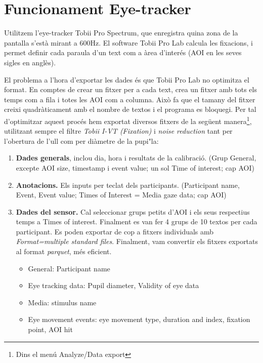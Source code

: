 \section{Funcionament Eye-tracker}\label{sec:tobii}

Utilitzem l'eye-tracker Tobii Pro Spectrum, que enregistra quina zona de la pantalla s'està mirant a 600Hz.
El software Tobii Pro Lab calcula les fixacions, i permet definir cada paraula d'un text com a àrea d'interés (AOI en les seves sigles en anglès).

El problema a l'hora d'exportar les dades és que Tobii Pro Lab no optimitza el format.
En comptes de crear un fitxer per a cada text, crea un fitxer amb tots els temps com a fila i totes les AOI com a columna.
Això fa que el tamany del fitxer creixi quadràticament amb el nombre de textos i el programa es bloquegi.
Per tal d'optimitzar aquest procés hem exportat diversos fitxers de la següent manera\footnote{Dins el menú Analyze/Data export},
utilitzant sempre el filtre \textit{Tobii I-VT (Fixation)} i \textit{noise reduction} tant per l'obertura de l'ull com per diàmetre de la pupi"la:

\begin{enumerate}
    \item \textbf{Dades generals}, inclou dia, hora i resultats de la calibració. (Grup General, excepte AOI size, timestamp i event value; un sol Time of interest; cap AOI)
    \item \textbf{Anotacions.} Els inputs per teclat dels participants. (Participant name, Event, Event value; Times of Interest = Media gaze data; cap AOI)
    \item \textbf{Dades del sensor.} Cal seleccionar grups petits d'AOI i els seus respectius temps a Times of interest. Finalment es van fer 4 grups de 10 textos per cada participant. Es poden exportar de cop a fitxers individuals amb \textit{Format=multiple standard files}. Finalment, vam convertir els fitxers exportats al format \textit{parquet}, més eficient.
        \begin{itemize}
            \item General: Participant name
            \item Eye tracking data: Pupil diameter, Validity of eye data
            \item Media: stimulus name
            \item Eye movement events: eye movement type, duration and index, fixation point, AOI hit
        \end{itemize}
\end{enumerate}



